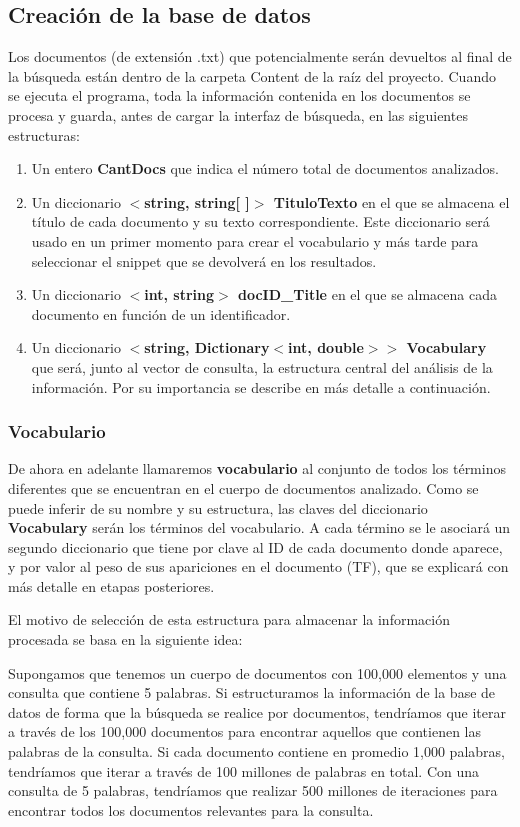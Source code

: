 \documentclass[12pt, letterpaper]{article}
\begin{document}
    \subsection{Creación de la base de datos}
    Los documentos (de extensión .txt) que potencialmente serán devueltos al final de la búsqueda están dentro de la carpeta Content de la raíz del proyecto. Cuando se ejecuta el programa, toda la información contenida en los documentos se procesa y guarda, antes de cargar la interfaz de búsqueda, en las siguientes estructuras: 
    \begin{enumerate}
        \item Un entero \textbf{CantDocs} que indica el número total de documentos analizados.
        \item Un diccionario \textbf{$<$string, string[ ]$>$ TituloTexto} en el que se almacena el título de cada documento y su texto correspondiente. Este diccionario será usado en un primer momento para crear el vocabulario y más tarde para seleccionar el snippet que se devolverá en los resultados.
        \item Un diccionario \textbf{$<$int, string$>$ docID\_Title} en el que se almacena cada documento en función de un identificador.
        \item Un diccionario \textbf{$<$string, Dictionary$<$int, double$>$$>$ Vocabulary} que será, junto al vector de consulta, la estructura central del análisis de la información. Por su importancia se describe en más detalle a continuación.
    \end{enumerate}
        \subsubsection{Vocabulario}
        De ahora en adelante llamaremos \textbf{vocabulario} al conjunto de todos los términos diferentes que se encuentran en el cuerpo de documentos analizado. Como se puede inferir de su nombre y su estructura, las claves del diccionario \textbf{Vocabulary} serán los términos del vocabulario. A cada término se le asociará un segundo diccionario que tiene por clave al ID de cada documento donde aparece, y por valor al peso de sus apariciones en el documento (TF), que se explicará con más detalle en etapas posteriores.
        
        El motivo de selección de esta estructura para almacenar la información procesada se basa en la siguiente idea:
        
        Supongamos que tenemos un cuerpo de documentos con 100,000 elementos y una consulta que contiene 5 palabras. Si estructuramos la información de la base de datos de forma que la búsqueda se realice por documentos, tendríamos que iterar a través de los 100,000 documentos para encontrar aquellos que contienen las palabras de la consulta. Si cada documento contiene en promedio 1,000 palabras, tendríamos que iterar a través de 100 millones de palabras en total. Con una consulta de 5 palabras, tendríamos que realizar 500 millones de iteraciones para encontrar todos los documentos relevantes para la consulta. 
        
\end{document}

